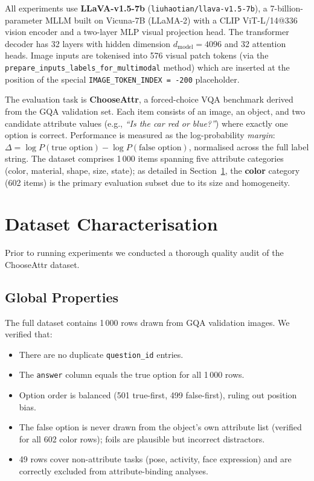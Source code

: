 \documentclass[11pt,a4paper]{article}
\begin{document}
All experiments use \textbf{LLaVA-v1.5-7b} (\texttt{liuhaotian/llava-v1.5-7b}), a
7-billion-parameter MLLM built on Vicuna-7B (LLaMA-2) with a CLIP ViT-L/14@336 vision encoder and a
two-layer MLP visual projection head. The transformer decoder has 32 layers with hidden dimension
$d_{\mathrm{model}} = 4096$ and 32 attention heads. Image inputs are tokenised into 576 visual
patch tokens (via the \texttt{prepare\_inputs\_labels\_for\_multimodal} method) which are inserted
at the position of the special \texttt{IMAGE\_TOKEN\_INDEX = -200} placeholder.

The evaluation task is \textbf{ChooseAttr}, a forced-choice VQA benchmark derived from the GQA
validation set. Each item consists of an image, an object, and two candidate attribute values (e.g.,
\emph{``Is the car red or blue?''}) where exactly one option is correct. Performance is measured as
the log-probability \emph{margin}: $\Delta = \log P(\text{true option}) - \log P(\text{false
option})$, normalised across the full label string. The dataset comprises 1\,000 items spanning five
attribute categories (color, material, shape, size, state); as detailed in
Section~\ref{sec:dataset}, the \textbf{color} category (602 items) is the primary evaluation subset
due to its size and homogeneity.


\section{Dataset Characterisation}
\label{sec:dataset}

Prior to running experiments we conducted a thorough quality audit of the ChooseAttr dataset.

\subsection{Global Properties}

The full dataset contains 1\,000 rows drawn from GQA validation images. We verified that:
\begin{itemize}[noitemsep]
  \item There are no duplicate \texttt{question\_id} entries.
  \item The \texttt{answer} column equals the true option for all 1\,000 rows.
  \item Option order is balanced (501 true-first, 499 false-first), ruling out position bias.
  \item The false option is never drawn from the object's own attribute list (verified for all 602
    color rows); foils are plausible but incorrect distractors.
  \item 49 rows cover non-attribute tasks (pose, activity, face expression) and are correctly
    excluded from attribute-binding analyses.
\end{itemize}
\end{document}

